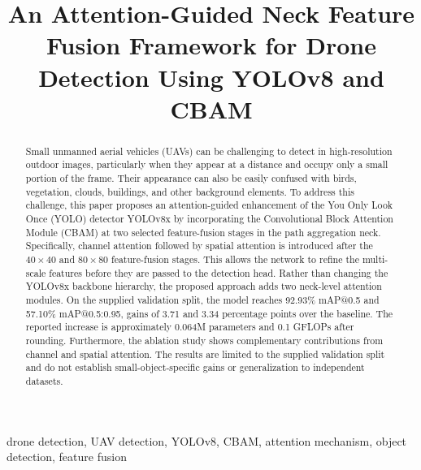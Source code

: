 \documentclass[conference]{IEEEtran}
\begin{document}
\title{An Attention-Guided Neck Feature Fusion Framework for Drone Detection Using YOLOv8 and CBAM}

\author{
}

\maketitle

\begin{abstract}
Small unmanned aerial vehicles (UAVs) can be challenging to detect in high-resolution outdoor images, particularly when they appear at a distance and occupy only a small portion of the frame. Their appearance can also be easily confused with birds, vegetation, clouds, buildings, and other background elements. To address this challenge, this paper proposes an attention-guided enhancement of the You Only Look Once (YOLO) detector YOLOv8x by incorporating the Convolutional Block Attention Module (CBAM) at two selected feature-fusion stages in the path aggregation neck. Specifically, channel attention followed by spatial attention is introduced after the $40\times40$ and $80\times80$ feature-fusion stages. This allows the network to refine the multi-scale features before they are passed to the detection head. Rather than changing the YOLOv8x backbone hierarchy, the proposed approach adds two neck-level attention modules. On the supplied validation split, the model reaches 92.93\% mAP@0.5 and 57.10\% mAP@0.5:0.95, gains of 3.71 and 3.34 percentage points over the baseline. The reported increase is approximately 0.064M parameters and 0.1 GFLOPs after rounding. Furthermore, the ablation study shows complementary contributions from channel and spatial attention. The results are limited to the supplied validation split and do not establish small-object-specific gains or generalization to independent datasets.
\end{abstract}

\begin{IEEEkeywords}
drone detection, UAV detection, YOLOv8, CBAM, attention mechanism, object detection, feature fusion
\end{IEEEkeywords}
\end{document}
